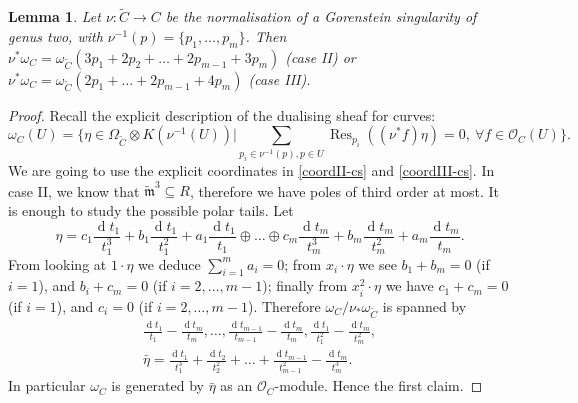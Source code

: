 \documentclass[11pt]{amsart}
\newcommand{\tm}{\widetilde{\mathfrak m}}
\newcommand{\OO}{\mathcal O}
\renewcommand{\to}{\rightarrow}
\theoremstyle{plain}
\newtheorem{lem}[thm]{Lemma}
\theoremstyle{definition}
\begin{document}
\begin{lem}\label{lem:dualising_lb}
 Let $\nu\colon\tilde C\to C$ be the normalisation of a Gorenstein singularity of genus two, with $\nu^{-1}(p)=\{p_1,\ldots,p_m\}$. Then $\nu^*\omega_C=\omega_{\tilde C}(3p_1+2p_2+\ldots+2p_{m-1}+3p_m)$ (case II) or $\nu^*\omega_C=\omega_{\tilde C}(2p_1+\ldots+2p_{m-1}+4p_m)$ (case III).
\end{lem}
\begin{proof}
 Recall the explicit description of the dualising sheaf for curves:
 \[\omega_C(U)=\{\eta\in \Omega_{\tilde C}\otimes K(\nu^{-1}(U)) | \sum_{p_i\in\nu^{-1}(p),p\in U}\operatorname{Res}_{p_i}((\nu^*f)\eta)=0,\ \forall f\in\OO_C(U)\}.\]
 We are going to use the explicit coordinates in \eqref{coordII-cs} and \eqref{coordIII-cs}. In case II, we know that $\tm^3\subseteq R$, therefore we have poles of third order at most. It is enough to study the possible polar tails. Let \[\eta=c_1\frac{\operatorname{d}t_1}{t_1^3}+b_1\frac{\operatorname{d}t_1}{t_1^2}+a_1\frac{\operatorname{d}t_1}{t_1}\oplus\ldots\oplus c_m\frac{\operatorname{d}t_m}{t_m^3}+b_m\frac{\operatorname{d}t_m}{t_m^2}+a_m\frac{\operatorname{d}t_m}{t_m}.\]
 From looking at $1\cdot\eta$ we deduce $\sum_{i=1}^m a_i=0$; from $x_i\cdot\eta$ we see $b_1+b_m=0$ (if $i=1$), and $b_i+c_m=0$ (if $i=2,\ldots,m-1$); finally from $x_i^2\cdot\eta$ we have $c_1+c_m=0$ (if $i=1$), and $c_i=0$ (if $i=2,\ldots,m-1$). Therefore $\omega_C/\nu_*\omega_{\tilde C}$ is spanned by
 \begin{align*}
  \frac{\operatorname{d}t_1}{t_1}-\frac{\operatorname{d}t_m}{t_m},\ldots,\frac{\operatorname{d}t_{m-1}}{t_{m-1}}-\frac{\operatorname{d}t_m}{t_m},\frac{\operatorname{d}t_1}{t_1^2}-\frac{\operatorname{d}t_m}{t_m^2},\\
  \bar{\eta}=\frac{\operatorname{d}t_1}{t_1^3}+\frac{\operatorname{d}t_2}{t_2^2}+\ldots+\frac{\operatorname{d}t_{m-1}}{t_{m-1}^2}-\frac{\operatorname{d}t_m}{t_m^3}.
 \end{align*}
In particular $\omega_C$ is generated by $\bar{\eta}$ as an $\OO_C$-module. Hence the first claim.


\end{proof}
\end{document}
